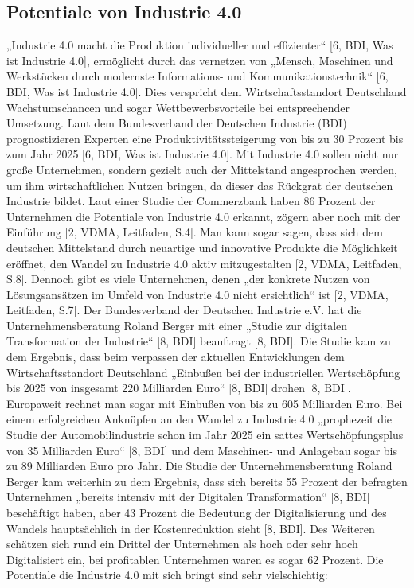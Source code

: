 \subsection{Potentiale von Industrie 4.0}\label{sec:PotentialeIndustrie4.0}

„Industrie 4.0 macht die Produktion individueller und effizienter“ [6, BDI, Was ist Industrie 4.0], ermöglicht durch das vernetzen von „Mensch, Maschinen und Werkstücken durch modernste Informations- und Kommunikationstechnik“ [6, BDI, Was ist Industrie 4.0]. Dies verspricht dem Wirtschaftsstandort Deutschland Wachstumschancen und sogar Wettbewerbsvorteile bei entsprechender Umsetzung. Laut dem Bundesverband der Deutschen Industrie (BDI) prognostizieren Experten eine Produktivitätssteigerung von bis zu 30 Prozent bis zum Jahr 2025 [6, BDI, Was ist Industrie 4.0].
\newline
Mit Industrie 4.0 sollen nicht nur große Unternehmen, sondern gezielt auch der Mittelstand angesprochen werden, um ihm wirtschaftlichen Nutzen bringen, da dieser das Rückgrat der deutschen Industrie bildet. Laut einer Studie der Commerzbank haben 86 Prozent der Unternehmen die Potentiale von Industrie 4.0 erkannt, zögern aber noch mit der Einführung [2, VDMA, Leitfaden, S.4]. Man kann sogar sagen, dass sich dem deutschen Mittelstand durch neuartige und innovative Produkte die Möglichkeit eröffnet, den Wandel zu Industrie 4.0 aktiv mitzugestalten [2, VDMA, Leitfaden, S.8]. Dennoch gibt es viele Unternehmen, denen „der konkrete Nutzen von Lösungsansätzen im Umfeld von Industrie 4.0 nicht ersichtlich“ ist [2, VDMA, Leitfaden, S.7]. 
\newline
Der Bundesverband der Deutschen Industrie e.V. hat die Unternehmensberatung Roland Berger mit einer „Studie zur digitalen Transformation der Industrie“ [8, BDI] beauftragt [8, BDI]. Die Studie kam zu dem Ergebnis, dass beim verpassen der aktuellen Entwicklungen dem Wirtschaftsstandort Deutschland „Einbußen bei der industriellen Wertschöpfung bis 2025 von insgesamt 220 Milliarden Euro“ [8, BDI] drohen [8, BDI]. Europaweit rechnet man sogar mit Einbußen von bis zu 605 Milliarden Euro. Bei einem erfolgreichen Anknüpfen an den Wandel zu Industrie 4.0 „prophezeit die Studie der Automobilindustrie schon im Jahr 2025 ein sattes Wertschöpfungsplus von 35 Milliarden Euro“ [8, BDI] und dem Maschinen- und Anlagebau sogar bis zu 89 Milliarden Euro pro Jahr. Die Studie der Unternehmensberatung Roland Berger kam weiterhin zu dem Ergebnis, dass sich bereits 55 Prozent der befragten Unternehmen „bereits intensiv mit der Digitalen Transformation“ [8, BDI] beschäftigt haben, aber 43 Prozent die Bedeutung der Digitalisierung und des Wandels hauptsächlich in der Kostenreduktion sieht [8, BDI]. Des Weiteren schätzen sich rund ein Drittel der Unternehmen als hoch oder sehr hoch Digitalisiert ein, bei profitablen Unternehmen waren es sogar 62 Prozent.
\newline\newline
Die Potentiale die Industrie 4.0 mit sich bringt sind sehr vielschichtig:

